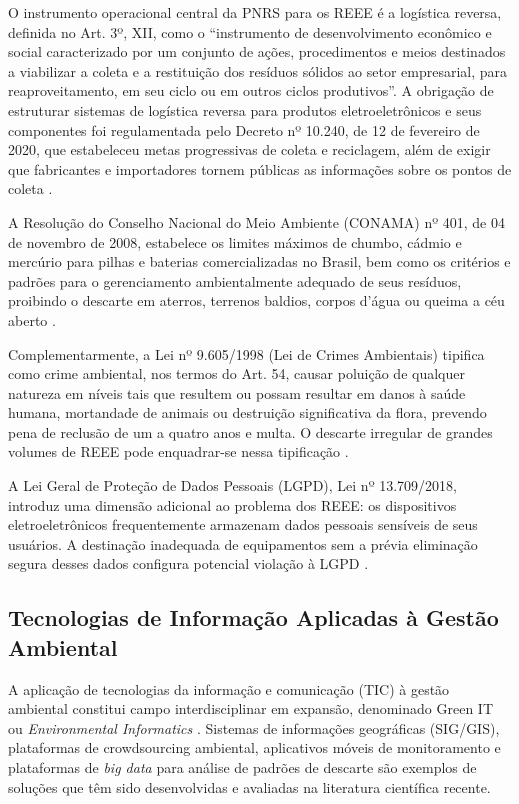 \documentclass[12pt, a4paper]{article}
\numberwithin{equation}{section}
\numberwithin{figure}{section}
\numberwithin{table}{section}
\begin{document}
O instrumento operacional central da PNRS para os REEE é a logística reversa,
definida no Art. 3º, XII, como o ``instrumento de desenvolvimento econômico e
social caracterizado por um conjunto de ações, procedimentos e meios destinados
a viabilizar a coleta e a restituição dos resíduos sólidos ao setor empresarial,
para reaproveitamento, em seu ciclo ou em outros ciclos produtivos''. A obrigação
de estruturar sistemas de logística reversa para produtos eletroeletrônicos
e seus componentes foi regulamentada pelo Decreto nº 10.240, de 12 de fevereiro
de 2020, que estabeleceu metas progressivas de coleta e reciclagem, além de
exigir que fabricantes e importadores tornem públicas as informações sobre os
pontos de coleta \cite{brasil2020decreto}.

A Resolução do Conselho Nacional do Meio Ambiente (CONAMA) nº 401, de 04 de
novembro de 2008, estabelece os limites máximos de chumbo, cádmio e mercúrio
para pilhas e baterias comercializadas no Brasil, bem como os critérios e
padrões para o gerenciamento ambientalmente adequado de seus resíduos,
proibindo o descarte em aterros, terrenos baldios, corpos d'água ou queima
a céu aberto \cite{conama401}.

Complementarmente, a Lei nº 9.605/1998 (Lei de Crimes Ambientais) tipifica
como crime ambiental, nos termos do Art. 54, causar poluição de qualquer
natureza em níveis tais que resultem ou possam resultar em danos à saúde
humana, mortandade de animais ou destruição significativa da flora, prevendo
pena de reclusão de um a quatro anos e multa. O descarte irregular de grandes
volumes de REEE pode enquadrar-se nessa tipificação \cite{brasil1998crimes}.

A Lei Geral de Proteção de Dados Pessoais (LGPD), Lei nº 13.709/2018, introduz
uma dimensão adicional ao problema dos REEE: os dispositivos eletroeletrônicos
frequentemente armazenam dados pessoais sensíveis de seus usuários. A destinação
inadequada de equipamentos sem a prévia eliminação segura desses dados configura
potencial violação à LGPD \cite{brasil2018lgpd}.

\subsection{Tecnologias de Informação Aplicadas à Gestão Ambiental}

A aplicação de tecnologias da informação e comunicação (TIC) à gestão ambiental
constitui campo interdisciplinar em expansão, denominado Green IT ou
\textit{Environmental Informatics} \cite{watson2010}. Sistemas de informações
geográficas (SIG/GIS), plataformas de crowdsourcing ambiental, aplicativos
móveis de monitoramento e plataformas de \textit{big data} para análise de
padrões de descarte são exemplos de soluções que têm sido desenvolvidas e
avaliadas na literatura científica recente.
\end{document}
